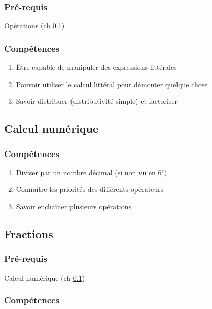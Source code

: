 \subsubsection*{Pré-requis}
 Opérations (ch \ref{ch_5_op})
 
 \subsubsection*{Compétences}
\begin{enumerate}
	\item Être capable de manipuler des expressions littérales
	\item Pouvoir utiliser le calcul littéral pour démonter quelque chose
	\item Savoir distribuer (distributivité simple) et factoriser
\end{enumerate}

\subsection{Calcul numérique}\label{ch_5_op}

\subsubsection*{Compétences}
\begin{enumerate}
	\item Diviser par un nombre décimal (si non vu en 6$^e$)
	\item Connaître les priorités des différents opérateurs
	\item Savoir enchaîner plusieurs opérations
	
\end{enumerate}

\subsection{Fractions}\label{ch_5_frac}

\subsubsection*{Pré-requis}

Calcul numérique (ch \ref{ch_5_op})

\subsubsection*{Compétences}

